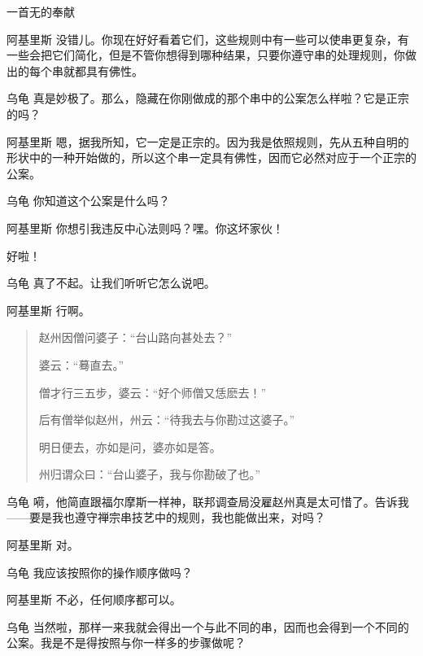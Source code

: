 \begin{dialog}{一首无的奉献\label{abcd}}
\begin{dialogue}
\item[阿基里斯]没错儿。你现在好好看着它们，这些规则中有一些可以使串更复杂，有一些会把它们简化，但是不管你想得到哪种结果，只要你遵守串的处理规则，你做出的每个串就都具有佛性。

\item[乌龟]真是妙极了。那么，隐藏在你刚做成的那个串中的公案怎么样啦？它是正宗的吗？

\item[阿基里斯]嗯，据我所知，它一定是正宗的。因为我是依照规则，先从五种自明的形状中的一种开始做的，所以这个串一定具有佛性，因而它必然对应于一个正宗的公案。

\item[乌龟]你知道这个公案是什么吗？

\item[阿基里斯]你想引我违反中心法则吗？嘿。你这坏家伙！


好啦！

\item[乌龟]真了不起。让我们听听它怎么说吧。

\item[阿基里斯]行啊。

  \begin{quote}
  赵州因僧问婆子：“台山路向甚处去？”
  
  婆云：“蓦直去。”
  
  僧才行三五步，婆云：“好个师僧又恁麽去！”
  
  后有僧举似赵州，州云：“待我去与你勘过这婆子。”
  
  明日便去，亦如是问，婆亦如是答。
  
  州归谓众曰：“台山婆子，我与你勘破了也。”
 \end{quote}

\item[乌龟]嗬，他简直跟福尔摩斯一样神，联邦调查局没雇赵州真是太可惜了。告诉我——要是我也遵守禅宗串技艺中的规则，我也能做出来，对吗？

\item[阿基里斯]对。

\item[乌龟]我应该按照你的操作顺序做吗？

\item[阿基里斯]不必，任何顺序都可以。

\item[乌龟]当然啦，那样一来我就会得出一个与此不同的串，因而也会得到一个不同的公案。我是不是得按照与你一样多的步骤做呢？


\end{dialogue}
\end{dialog}
